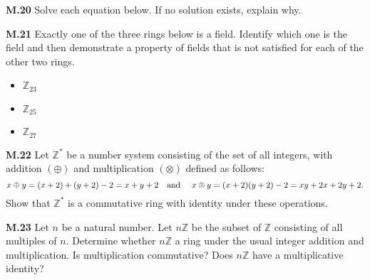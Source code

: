 \documentclass[addpoints]{exam}
\begin{document}
\begin{questions}
\question \textbf{M.20}
Solve each equation below. If no solution exists, explain why.


\question \textbf{M.21}
Exactly one of the three rings below is a field. Identify which one is the field and then demonstrate a property of fields that is not satisfied for each of the other two rings.
\begin{itemize}
\item $\mathbb{Z}_{23}$
\item $\mathbb{Z}_{25}$
\item $\mathbb{Z}_{27}$
\end{itemize}


\question \textbf{M.22}
Let $\mathbb{Z}^*$ be a number system consisting of the set of all integers, with addition $(\oplus)$ and multiplication $(\otimes)$ defined as follows:
\[
x\oplus y=(x+2)+(y+2)-2= x+y+2\text{\quad and \quad}x\otimes y=(x+2)(y+2)-2=xy+2x+2y+2.
\]
Show that $\mathbb{Z}^*$ is a commutative ring with identity under these operations.

\question \textbf{M.23}
Let $n$ be a natural number. Let $n\mathbb{Z}$ be the subset of $\mathbb{Z}$ consisting of all multiples of $n$. Determine whether  $n\mathbb{Z}$ a ring under the usual integer addition and multiplication. Is multiplication commutative? Does $n\mathbb{Z}$ have a multiplicative identity?







\end{questions}
\end{document}
